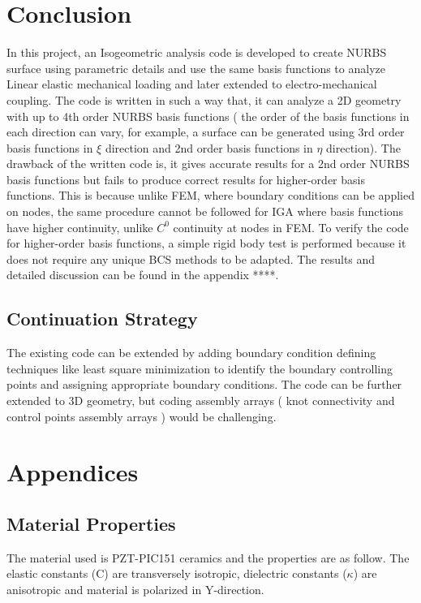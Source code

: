 \documentclass[11pt]{article}
\begin{document}
\section{Conclusion}
In this project, an Isogeometric analysis code is developed to create NURBS surface using parametric details and use the same basis functions to analyze Linear elastic mechanical loading and later extended to electro-mechanical coupling. The code is written in such a way that, it can analyze a 2D geometry with up to 4th order NURBS basis functions ( the order of the basis functions in each direction can vary, for example, a surface can be generated using 3rd order basis functions in $\xi$ direction and 2nd order basis functions in $\eta$ direction). The drawback of the written code is, it gives accurate results for a 2nd order NURBS basis functions but fails to produce correct results for higher-order basis functions. This is because unlike FEM, where boundary conditions can be applied on nodes, the same procedure cannot be followed for IGA where basis functions have higher continuity, unlike $C^0$ continuity at nodes in FEM. To verify the code for higher-order basis functions, a simple rigid body test is performed because it does not require any unique BCS methods to be adapted. The results and detailed discussion can be found in the appendix ****.

\subsection{Continuation Strategy}

The existing code can be extended by adding boundary condition defining techniques like least square minimization to identify the boundary controlling points and assigning appropriate boundary conditions. The code can be further extended to 3D geometry, but coding assembly arrays ( knot connectivity and control points assembly arrays ) would be challenging.


\newpage
\section{Appendices}

\subsection{Material Properties} \label{MaterialProps}
The material used is
PZT-PIC151 ceramics and the properties \cite{kozinov2018simulation} are as follow. The elastic constants (C) are transversely isotropic, dielectric constants ($\kappa$) are anisotropic and material is polarized in Y-direction. 
\end{document}
